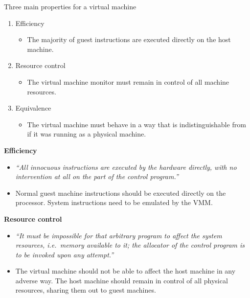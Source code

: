 \documentclass[11pt,a4paper]{article}
\begin{document}
Three main properties for a virtual machine
\begin{enumerate}
    \item Efficiency
        \begin{itemize}
            \item The majority of guest instructions are executed directly on the host machine.
        \end{itemize}
    \item Resource control
        \begin{itemize}
            \item The virtual machine monitor must remain in control of all machine resources.
        \end{itemize}
    \item Equivalence
        \begin{itemize}
            \item The virtual machine must behave in a way that is indistinguishable from if it
                was running as a physical machine.
        \end{itemize}
\end{enumerate}

\textbf{Efficiency}
\begin{itemize}
    \item \emph{``All innocuous instructions are executed by the hardware directly,
        with no intervention at all on the part of the control program.''}
    \item Normal guest machine instructions should be executed directly on the processor.
        System instructions need to be emulated by the VMM.\
\end{itemize}

\textbf{Resource control}
\begin{itemize}
    \item \emph{``It must be impossible for that arbitrary program to affect the system
            resources, i.e.\ memory available to it;
        the allocator of the control program is to be invoked upon any attempt.''}
    \item The virtual machine should not be able to affect the host machine in any adverse way.
        The host machine should remain in control of all physical resources,
        sharing them out to guest machines.
\end{itemize}
\end{document}
